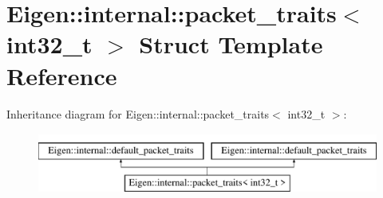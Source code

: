 \hypertarget{struct_eigen_1_1internal_1_1packet__traits_3_01int32__t_01_4}{}\section{Eigen\+:\+:internal\+:\+:packet\+\_\+traits$<$ int32\+\_\+t $>$ Struct Template Reference}
\label{struct_eigen_1_1internal_1_1packet__traits_3_01int32__t_01_4}
Inheritance diagram for Eigen\+:\+:internal\+:\+:packet\+\_\+traits$<$ int32\+\_\+t $>$\+:\begin{figure}[H]
\begin{center}
\leavevmode
\includegraphics[height=2.000000cm]{struct_eigen_1_1internal_1_1packet__traits_3_01int32__t_01_4}
\end{center}
\end{figure}
